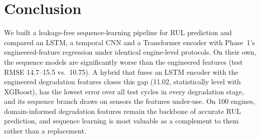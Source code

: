\section{Conclusion}
We built a leakage-free sequence-learning pipeline for RUL prediction and compared an LSTM, a temporal CNN and a Transformer encoder with Phase~1's engineered-feature regression under identical engine-level protocols. On their own, the sequence models are significantly worse than the engineered features (test RMSE 14.7--15.5 vs.\ 10.75). A hybrid that fuses an LSTM encoder with the engineered degradation features closes this gap (11.02, statistically level with XGBoost), has the lowest error over all test cycles in every degradation stage, and its sequence branch draws on sensors the features under-use. On 100 engines, domain-informed degradation features remain the backbone of accurate RUL prediction, and sequence learning is most valuable as a complement to them rather than a replacement.
